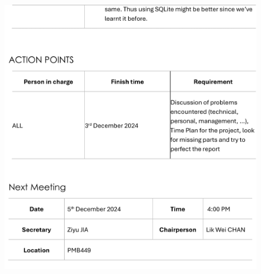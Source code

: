 \documentclass[a4paper,12pt, oneside]{report}
\begin{document}
\begin{appendices}
\begin{figure}[H]
    \includegraphics[width=\textwidth]{Minutes/Minutes_7-cropped-2.png}
\end{figure}

\end{appendices}
\end{document}
